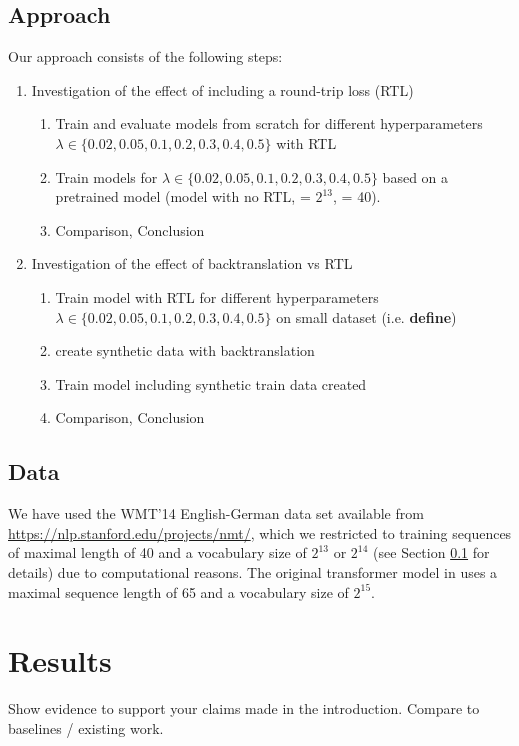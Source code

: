 \documentclass[11pt,a4paper]{article}
\begin{document}
\subsection{Approach} \label{Approach}
Our approach consists of the following steps:
\begin{enumerate}
    \item Investigation of the effect of including a round-trip loss (RTL)
    \begin{enumerate}
        \item Train and evaluate models from scratch for different hyperparameters $\lambda \in \{0.02, 0.05, 0.1, 0.2, 0.3, 0.4, 0.5\}$ with RTL
        \item Train models for $\lambda \in \{0.02, 0.05, 0.1, 0.2, 0.3, 0.4, 0.5\}$ based on a pretrained model (model with no RTL,  = $2^{13}$,  = 40).
        \item Comparison, Conclusion
    \end{enumerate}
    \item Investigation of the effect of backtranslation vs RTL
    \begin{enumerate}
        \item Train model with RTL for different hyperparameters $\lambda \in \{0.02, 0.05, 0.1, 0.2, 0.3, 0.4, 0.5\}$ on small dataset (i.e. \textbf{define})
        \item create synthetic data with backtranslation
        \item Train model including synthetic train data created
        \item Comparison, Conclusion
    \end{enumerate}
\end{enumerate}


\subsection{Data}
We have used the WMT'14 English-German data set available from \href{https://nlp.stanford.edu/projects/nmt/}{https://nlp.stanford.edu/projects/nmt/}, which we restricted to training sequences of maximal length of 40 and a vocabulary size of $2^{13}$ or $2^{14}$ (see Section \ref{Approach} for details) due to computational reasons. The original transformer model in  uses a maximal sequence length of 65 and a vocabulary size of $2^{15}$.

\section{Results}
Show evidence to support your claims made in the introduction. Compare to baselines / existing work.
\end{document}
